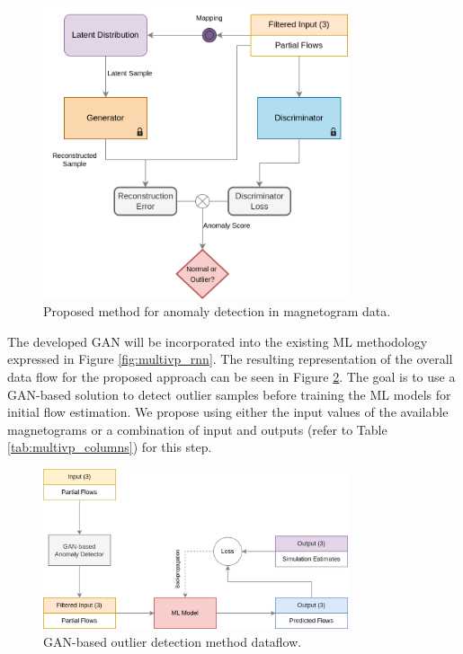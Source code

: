 \begin{figure}[ht]
\centering
\includegraphics[width=0.8\textwidth]{figures/proposed_gan_arch.png}
\caption{Proposed method for anomaly detection in magnetogram data.}
\label{fig:proposed_gan_arch}
\end{figure}

The developed GAN will be incorporated into the existing ML methodology expressed in Figure \ref{fig:multivp_rnn}. The resulting representation of the overall data flow for the proposed approach can be seen in Figure \ref{fig:gan_rnn_multivp}. The goal is to use a GAN-based solution to detect outlier samples before training the ML models for initial flow estimation. We propose using either the input values of the available magnetograms or a combination of input and outputs (refer to Table \ref{tab:multivp_columns}) for this step.

\begin{figure}[ht]
\centering
\includegraphics[width=0.8\textwidth]{figures/gan_rnn_multivp.png}
\caption{GAN-based outlier detection method dataflow.}
\label{fig:gan_rnn_multivp}
\end{figure}

